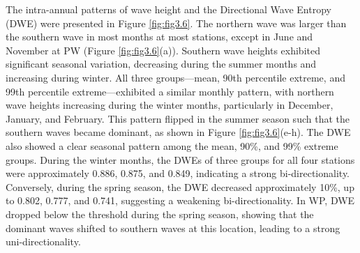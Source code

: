 The intra-annual patterns of wave height and the Directional Wave Entropy (DWE)
were presented in Figure \ref{fig:fig3.6}. The northern wave was larger than the
southern wave in most months at most stations, except in June and November at PW
(Figure \ref{fig:fig3.6}(a)). Southern wave heights exhibited significant
seasonal variation, decreasing during the summer months and increasing during
winter. All three groups—mean, 90th percentile extreme, and 99th percentile
extreme—exhibited a similar monthly pattern, with northern wave heights
increasing during the winter months, particularly in December, January, and
February. This pattern flipped in the summer season such that the southern waves
became dominant, as shown in Figure \ref{fig:fig3.6}(e-h). The DWE also showed a
clear seasonal pattern among the mean, 90\%, and 99\% extreme groups. During the
winter months, the DWEs of three groups for all four stations were approximately
0.886, 0.875, and 0.849, indicating a strong bi-directionality. Conversely,
during the spring season, the DWE decreased approximately 10\%, up to 0.802,
0.777, and 0.741, suggesting a weakening bi-directionality. In WP, DWE dropped
below the threshold during the spring season, showing that the dominant waves
shifted to southern waves at this location, leading to a strong
uni-directionality.  

